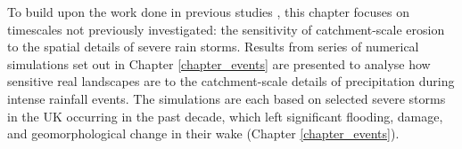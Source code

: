 %

To build upon the work done in previous studies \citep[e.g.][]{coulthard2016sensitivity}, this chapter focuses on timescales not previously investigated: the sensitivity of catchment-scale erosion to the spatial details of severe rain storms. 
Results from series of numerical simulations set out in Chapter \ref{chapter_events} are presented to analyse how sensitive real landscapes are to the catchment-scale details of precipitation during intense rainfall events. The simulations are each based on selected severe storms in the UK occurring in the past decade, which left significant flooding, damage, and geomorphological change in their wake (Chapter \ref{chapter_events}).

